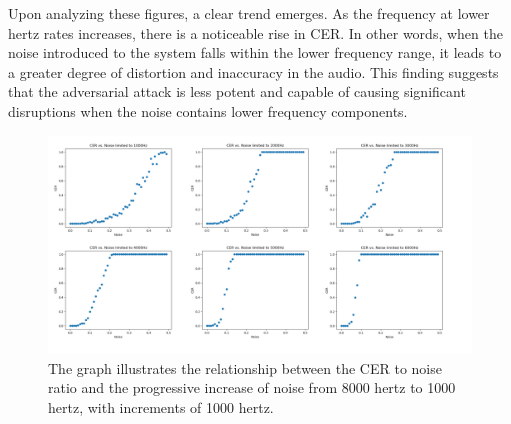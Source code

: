 \documentclass[11pt,a4paper]{article}
\begin{document}
Upon analyzing these figures, a clear trend emerges. As the frequency at lower
hertz rates increases, there is a noticeable rise in CER. In other words, when
the noise introduced to the system falls within the lower frequency range, it
leads to a greater degree of distortion and inaccuracy in the audio. This
finding suggests that the adversarial attack is less potent and capable of
causing significant disruptions when the noise contains lower frequency
components.


\begin{figure}
  \centering
  \includegraphics[width=1.0\textwidth]{images/CER_vs_Noise_bandwidth_high_to_low_HD.png}
  \caption{The graph illustrates the relationship between the CER to noise ratio and the progressive increase of noise from 8000 hertz to 1000 hertz, with increments of 1000 hertz.}
  \label{fig:cer_vs_noise_high_to_low}
\end{figure}
\end{document}
